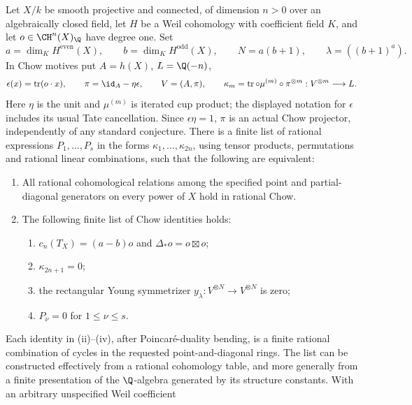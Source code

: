 \begin{theorem}
\label{c:finite-unconditional-criterion}
Let $X/k$ be smooth projective and connected, of dimension $n>0$
over an algebraically closed field, let $H$ be a Weil cohomology
with coefficient field $K$, and let
$o\in\CH^n(X)_\Q$ have degree one.  Set
\[
 a=\dim_K H^{\mathrm{even}}(X),\qquad
 b=\dim_K H^{\mathrm{odd}}(X),\qquad
 N=a(b+1),\qquad \lambda=((b+1)^a).
\]
In Chow motives put $A=h(X)$, $L=\Q(-n)$,
\[
 \epsilon(x)=\operatorname{tr}(o\cdot x),\qquad
 \pi=\id_A-\eta\epsilon,\qquad V=(A,\pi),
 \qquad
 \kappa_m=\operatorname{tr}\circ\mu^{(m)}\circ\pi^{\otimes m}
       :V^{\otimes m}\longrightarrow L.
\]
Here $\eta$ is the unit and $\mu^{(m)}$ is iterated cup product;
the displayed notation for $\epsilon$ includes its usual Tate
cancellation.  Since $\epsilon\eta=1$, $\pi$ is an actual Chow
projector, independently of any standard conjecture.  There is
a finite list of rational expressions $P_1,\ldots,P_s$ in the
forms $\kappa_1,\ldots,\kappa_{2n}$, using tensor products,
permutations and rational linear combinations, such that the
following are equivalent:
\begin{enumerate}[label=(\Alph*)]
\item All rational cohomological relations among the specified
      point and partial-diagonal generators on every power of $X$
      hold in rational Chow.
\item The following finite list of Chow identities holds:
      \begin{enumerate}[label=(\roman*)]
      \item $c_n(T_X)=(a-b)o$ and $\Delta_*o=o\boxtimes o$;
      \item $\kappa_{2n+1}=0$;
      \item the rectangular Young symmetrizer
            $y_\lambda:V^{\otimes N}\to V^{\otimes N}$ is zero;
      \item $P_\nu=0$ for $1\leq\nu\leq s$.
      \end{enumerate}
\end{enumerate}
Each identity in (ii)--(iv), after Poincar\'e-duality bending,
is a finite rational combination of cycles in the requested
point-and-diagonal rings.  The list can be constructed effectively
from a rational cohomology table, and more generally from a finite
presentation of the $\Q$-algebra generated by its structure
constants.  With an arbitrary unspecified Weil coefficient

\end{theorem}
